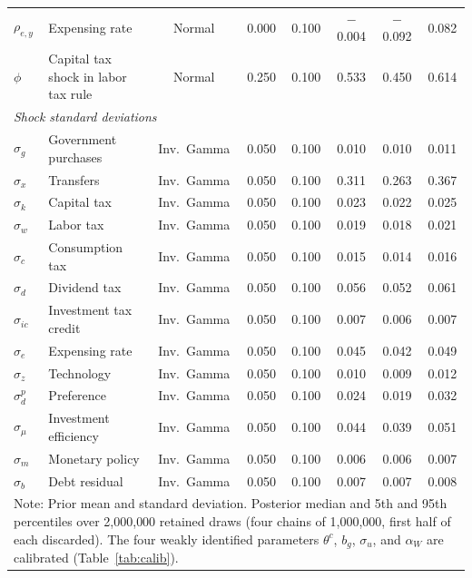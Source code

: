 {\begin{longtable}{llcccccc}
$\rho_{e,y}$ & Expensing rate & Normal & 0.000 & 0.100 & $-$0.004 & $-$0.092 & 0.082 \\
$\phi$ & Capital tax shock in labor tax rule & Normal & 0.250 & 0.100 & 0.533 & 0.450 & 0.614 \\
\multicolumn{8}{l}{\textit{Shock standard deviations}} \\
$\sigma_g$ & Government purchases & Inv.\ Gamma & 0.050 & 0.100 & 0.010 & 0.010 & 0.011 \\
$\sigma_x$ & Transfers & Inv.\ Gamma & 0.050 & 0.100 & 0.311 & 0.263 & 0.367 \\
$\sigma_k$ & Capital tax & Inv.\ Gamma & 0.050 & 0.100 & 0.023 & 0.022 & 0.025 \\
$\sigma_w$ & Labor tax & Inv.\ Gamma & 0.050 & 0.100 & 0.019 & 0.018 & 0.021 \\
$\sigma_c$ & Consumption tax & Inv.\ Gamma & 0.050 & 0.100 & 0.015 & 0.014 & 0.016 \\
$\sigma_d$ & Dividend tax & Inv.\ Gamma & 0.050 & 0.100 & 0.056 & 0.052 & 0.061 \\
$\sigma_{ic}$ & Investment tax credit & Inv.\ Gamma & 0.050 & 0.100 & 0.007 & 0.006 & 0.007 \\
$\sigma_e$ & Expensing rate & Inv.\ Gamma & 0.050 & 0.100 & 0.045 & 0.042 & 0.049 \\
$\sigma_z$ & Technology & Inv.\ Gamma & 0.050 & 0.100 & 0.010 & 0.009 & 0.012 \\
$\sigma_d^{p}$ & Preference & Inv.\ Gamma & 0.050 & 0.100 & 0.024 & 0.019 & 0.032 \\
$\sigma_\mu$ & Investment efficiency & Inv.\ Gamma & 0.050 & 0.100 & 0.044 & 0.039 & 0.051 \\
$\sigma_m$ & Monetary policy & Inv.\ Gamma & 0.050 & 0.100 & 0.006 & 0.006 & 0.007 \\
$\sigma_b$ & Debt residual & Inv.\ Gamma & 0.050 & 0.100 & 0.007 & 0.007 & 0.008 \\
\hline\hline
\multicolumn{8}{p{0.95\textwidth}}{\footnotesize Note: Prior mean and standard deviation. Posterior median and 5th and 95th percentiles over 2{,}000{,}000 retained draws (four chains of 1{,}000{,}000, first half of each discarded). The four weakly identified parameters $\theta^c$, $b_g$, $\sigma_u$, and $\alpha_W$ are calibrated (Table~\ref{tab:calib}).}
\end{longtable}
}
